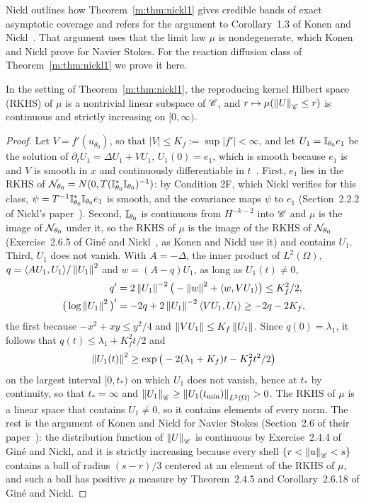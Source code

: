 Nickl outlines how Theorem~\ref{m:thm:nickl1} gives credible bands of exact asymptotic coverage and refers for the argument to Corollary~1.3 of Konen and Nickl~\cite{konennickl2026}. That argument uses that the limit law $\mu$ is nondegenerate, which Konen and Nickl prove for Navier Stokes. For the reaction diffusion class of Theorem~\ref{m:thm:nickl1} we prove it here.

\begin{lemma}\label{m:lem:nondeg}
In the setting of Theorem~\ref{m:thm:nickl1}, the reproducing kernel Hilbert space (RKHS) of $\mu$ is a nontrivial linear subspace of $\mathscr{C}$, and $r\mapsto\mu(\left\|U\right\|_{\mathscr{C}}\le r)$ is continuous and strictly increasing on $[0,\infty)$.
\end{lemma}

\begin{proof}
Let $V=f'(u_{\theta_0})$, so that $|V|\le K_f:=\sup|f'|<\infty$, and let $U_1=\mathbb{I}_{\theta_0}e_1$ be the solution of $\partial_tU_1=\Delta U_1+VU_1$, $U_1(0)=e_1$, which is smooth because $e_1$ is and $V$ is smooth in $x$ and continuously differentiable in $t$~\cite{nicklbvm2024}. First, $e_1$ lies in the RKHS of $\mathcal{N}_{\theta_0}=N(0,T(\mathbb{I}^*_{\theta_0}\mathbb{I}_{\theta_0})^{-1})$: by Condition 2F, which Nickl verifies for this class, $\psi=T^{-1}\mathbb{I}^*_{\theta_0}\mathbb{I}_{\theta_0}e_1$ is smooth, and the covariance maps $\psi$ to $e_1$ (Section~2.2.2 of Nickl's paper~\cite{nicklbvm2024}). Second, $\mathbb{I}_{\theta_0}$ is continuous from $H^{-k-2}$ into $\mathscr{C}$ and $\mu$ is the image of $\mathcal{N}_{\theta_0}$ under it, so the RKHS of $\mu$ is the image of the RKHS of $\mathcal{N}_{\theta_0}$ (Exercise~2.6.5 of Gin\'e and Nickl~\cite{ginenickl2016}, as Konen and Nickl use it) and contains $U_1$. Third, $U_1$ does not vanish. With $A=-\Delta$, the inner product of $L^2(\Omega)$, $q=\langle AU_1,U_1\rangle/\left\|U_1\right\|^2$ and $w=(A-q)U_1$, as long as $U_1(t)\ne0$,
\[
\begin{aligned}
q'&=2\left\|U_1\right\|^{-2}\big(-\left\|w\right\|^2+\langle w,VU_1\rangle\big)\le K_f^2/2,\\
\big(\log\left\|U_1\right\|^2\big)'&=-2q+2\left\|U_1\right\|^{-2}\langle VU_1,U_1\rangle\ge-2q-2K_f,
\end{aligned}
\]
the first because $-x^2+xy\le y^2/4$ and $\left\|VU_1\right\|\le K_f\left\|U_1\right\|$. Since $q(0)=\lambda_1$, it follows that $q(t)\le\lambda_1+K_f^2t/2$ and
\[
\left\|U_1(t)\right\|^2\ge\exp\big(-2(\lambda_1+K_f)t-K_f^2t^2/2\big)
\]
on the largest interval $[0,t_*)$ on which $U_1$ does not vanish, hence at $t_*$ by continuity, so that $t_*=\infty$ and $\left\|U_1\right\|_{\mathscr{C}}\ge\left\|U_1(t_{\min})\right\|_{L^2(\Omega)}>0$. The RKHS of $\mu$ is a linear space that contains $U_1\ne0$, so it contains elements of every norm. The rest is the argument of Konen and Nickl for Navier Stokes (Section~2.6 of their paper~\cite{konennickl2026}): the distribution function of $\left\|U\right\|_{\mathscr{C}}$ is continuous by Exercise~2.4.4 of Gin\'e and Nickl, and it is strictly increasing because every shell $\{r<\left\|u\right\|_{\mathscr{C}}<s\}$ contains a ball of radius $(s-r)/3$ centered at an element of the RKHS of $\mu$, and such a ball has positive $\mu$ measure by Theorem~2.4.5 and Corollary~2.6.18 of Gin\'e and Nickl.
\end{proof}

